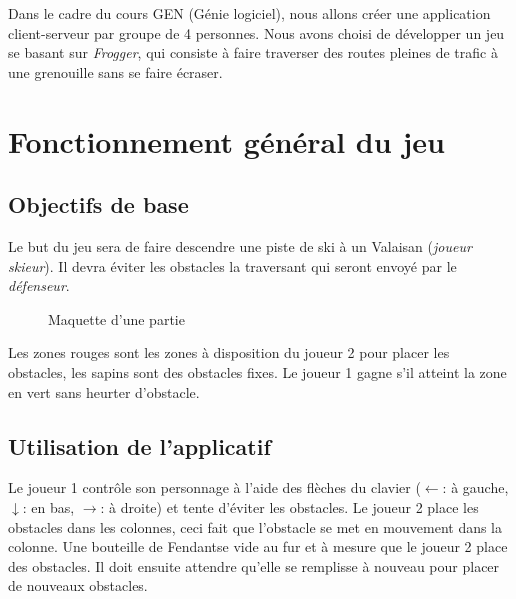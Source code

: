 \documentclass[a4paper,12pt]{article}
\begin{document}
	
	Dans le cadre du cours GEN (Génie logiciel), nous allons créer une application client-serveur par groupe de 4 personnes. Nous avons choisi de développer un jeu se basant sur \textit{Frogger}, qui consiste à faire traverser des routes pleines de trafic à une grenouille sans se faire écraser. 
	
	
	\section{Fonctionnement général du jeu}
	
	
	\subsection{Objectifs de base}
	
	Le but du jeu sera de faire descendre une piste de ski à un Valaisan (\textit{joueur skieur}). Il devra éviter les obstacles la traversant qui seront envoyé par le \textit{défenseur}.
	
	\begin{figure}[h!]
		\centering
		\caption{Maquette d'une partie}
		\label{fig:maquette}
	\end{figure}
	
	Les zones rouges sont les zones à disposition du joueur 2 pour placer les obstacles, les sapins sont des obstacles fixes. Le joueur 1 gagne s'il atteint la zone en vert sans heurter d'obstacle.
	
	
	\subsection{Utilisation de l'applicatif}
	Le joueur 1 contrôle son personnage à l'aide des flèches du clavier ($\leftarrow$: à gauche, $\downarrow $: en bas, $\rightarrow$: à droite) et tente d'éviter les obstacles. Le joueur 2 place les obstacles dans les colonnes, ceci fait que l'obstacle se met en mouvement dans la colonne. Une bouteille de Fendant\texttrademark se vide au fur et à mesure que le joueur 2 place des obstacles. Il doit ensuite attendre qu'elle se remplisse à nouveau pour placer de nouveaux obstacles.\par
	
\end{document}
